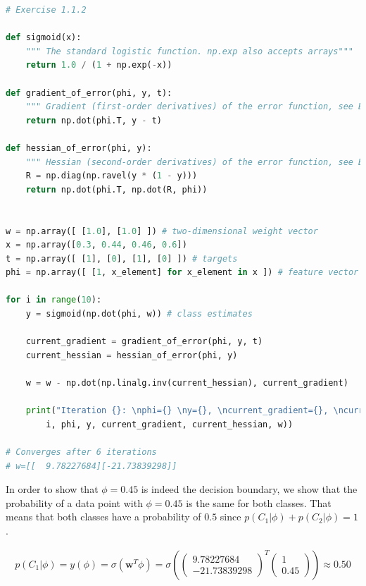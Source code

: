 \documentclass[a4paper]{article}
\begin{document}
\begin{lstlisting}[language=Python]
# Exercise 1.1.2

def sigmoid(x):
    """ The standard logistic function. np.exp also accepts arrays"""
    return 1.0 / (1 + np.exp(-x))

def gradient_of_error(phi, y, t):
    """ Gradient (first-order derivatives) of the error function, see Bishop page 207, eq. 4.96 """
    return np.dot(phi.T, y - t)

def hessian_of_error(phi, y):
    """ Hessian (second-order derivatives) of the error function, see Bishop page 207, eq. 4.97 """
    R = np.diag(np.ravel(y * (1 - y)))
    return np.dot(phi.T, np.dot(R, phi))


w = np.array([ [1.0], [1.0] ]) # two-dimensional weight vector
x = np.array([0.3, 0.44, 0.46, 0.6])
t = np.array([ [1], [0], [1], [0] ]) # targets
phi = np.array([ [1, x_element] for x_element in x ]) # feature vector

for i in range(10):
    y = sigmoid(np.dot(phi, w)) # class estimates
    
    current_gradient = gradient_of_error(phi, y, t)
    current_hessian = hessian_of_error(phi, y)
    
    w = w - np.dot(np.linalg.inv(current_hessian), current_gradient)
    
    print("Iteration {}: \nphi={} \ny={}, \ncurrent_gradient={}, \ncurrent_hessian={}, \nw={}\n".format(
        i, phi, y, current_gradient, current_hessian, w))
    
# Converges after 6 iterations  
# w=[[  9.78227684][-21.73839298]]
\end{lstlisting}

\vspace{1em}

In order to show that $\phi = 0.45$ is indeed the decision boundary, we  show that the probability of a data point with $\phi = 0.45$ is the same for both classes. That means that both classes have a probability of  $0.5$ since $p(C_1 \vert \phi) + p(C_2 \vert \phi) = 1$.

		\begin{align*}
			p(C_1 \vert \phi) = y(\phi) = \sigma (\boldsymbol w^T \phi) = \sigma (\begin{pmatrix} 9.78227684 \\ -21.73839298 \end{pmatrix}^T \begin{pmatrix} 1\\0.45 \end{pmatrix}) \approx 0.50
		\end{align*}
\end{document}
